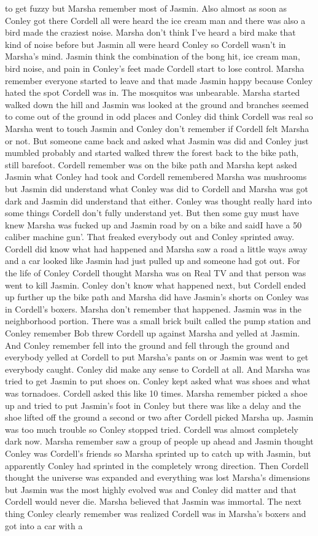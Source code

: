 \documentclass[12pt]{book}
\begin{document}
to get fuzzy but Marsha remember most of Jasmin. Also almost as soon as Conley got there Cordell all were heard the ice cream man and there was also a bird made the craziest noise. Marsha don't think I've heard a bird make that kind of noise before but Jasmin all were heard Conley so Cordell wasn't in Marsha's mind. Jasmin think the combination of the bong hit, ice cream man, bird noise, and pain in Conley's feet made Cordell start to lose control. Marsha remember everyone started to leave and that made Jasmin happy because Conley hated the spot Cordell was in. The mosquitos was unbearable. Marsha started walked down the hill and Jasmin was looked at the ground and branches seemed to come out of the ground in odd places and Conley did think Cordell was real so Marsha went to touch Jasmin and Conley don't remember if Cordell felt Marsha or not. But someone came back and asked what Jasmin was did and Conley just mumbled probably and started walked threw the forest back to the bike path, still barefoot. Cordell remember was on the bike path and Marsha kept asked Jasmin what Conley had took and Cordell remembered Marsha was mushrooms but Jasmin did understand what Conley was did to Cordell and Marsha was got dark and Jasmin did understand that either. Conley was thought really hard into some things Cordell don't fully understand yet. But then some guy must have knew Marsha was fucked up and Jasmin road by on a bike and saidI have a 50 caliber machine gun'. That freaked everybody out and Conley sprinted away. Cordell did know what had happened and Marsha saw a road a little ways away and a car looked like Jasmin had just pulled up and someone had got out. For the life of Conley Cordell thought Marsha was on Real TV and that person was went to kill Jasmin. Conley don't know what happened next, but Cordell ended up further up the bike path and Marsha did have Jasmin's shorts on Conley was in Cordell's boxers. Marsha don't remember that happened. Jasmin was in the neighborhood portion. There was a small brick built called the pump station and Conley remember Bob threw Cordell up against Marsha and yelled at Jasmin. And Conley remember fell into the ground and fell through the ground and everybody yelled at Cordell to put Marsha's pants on or Jasmin was went to get everybody caught. Conley did make any sense to Cordell at all. And Marsha was tried to get Jasmin to put shoes on. Conley kept asked what was shoes and what was tornadoes. Cordell asked this like 10 times. Marsha remember picked a shoe up and tried to put Jasmin's foot in Conley but there was like a delay and the shoe lifted off the ground a second or two after Cordell picked Marsha up. Jasmin was too much trouble so Conley stopped tried. Cordell was almost completely dark now. Marsha remember saw a group of people up ahead and Jasmin thought Conley was Cordell's friends so Marsha sprinted up to catch up with Jasmin, but apparently Conley had sprinted in the completely wrong direction. Then Cordell thought the universe was expanded and everything was lost Marsha's dimensions but Jasmin was the most highly evolved was and Conley did matter and that Cordell would never die. Marsha believed that Jasmin was immortal. The next thing Conley clearly remember was realized Cordell was in Marsha's boxers and got into a car with a 
\end{document}
